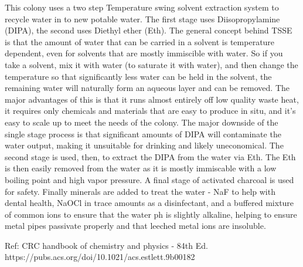 \documentclass[10pt]{article}
\begin{document}
This colony uses a two step Temperature swing solvent extraction system to recycle water in to new potable water. The first stage uses Diisopropylamine (DIPA), the second uses Diethyl ether (Eth). The general concept behind TSSE is that the amount of water that can be carried in a solvent is temperature dependent, even for solvents that are mostly immiscible with water. So if you take a solvent, mix it with water (to saturate it with water), and then change the temperature so that significantly less water can be held in the solvent, the remaining water will naturally form an aqueous layer and can be removed. The major advantages of this is that it runs almost entirely off low quality waste heat, it requires only chemicals and materials that are easy to produce in situ, and it's easy to scale up to meet the needs of the colony. The major downside of the single stage process is that significant amounts of DIPA will contaminate the water output, making it unsuitable for drinking and likely uneconomical. The second stage is used, then, to extract the DIPA from the water via Eth. The Eth is then easily removed from the water as it is mostly immiscable with a low boiling point and high vapor pressure. A final stage of activated charcoal is used for safety. Finally minerals are added to treat the water - NaF to help with dental health, NaOCl in trace amounts as a disinfectant, and a buffered mixture of common ions to ensure that the water ph is slightly alkaline, helping to ensure metal pipes passivate properly and that leeched metal ions are insoluble.

Ref: CRC handbook of chemistry and physics - 84th Ed. https://pubs.acs.org/doi/10.1021/acs.estlett.9b00182
\end{document}
